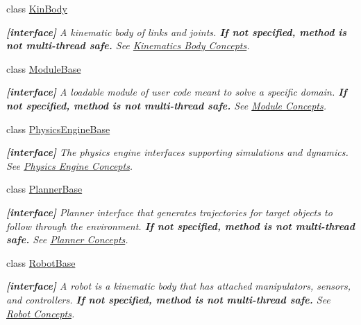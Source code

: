 \begin{DoxyCompactItemize}
class \hyperlink{classOpenRAVE_1_1KinBody}{KinBody}
\begin{DoxyCompactList}\small\item\em {\bfseries \mbox{[}interface\mbox{]}} A kinematic body of links and joints. {\bfseries If not specified, method is not multi-\/thread safe.} See \hyperlink{arch__kinbody}{Kinematics Body Concepts}. \item\end{DoxyCompactList}\item 
class \hyperlink{classOpenRAVE_1_1ModuleBase}{ModuleBase}
\begin{DoxyCompactList}\small\item\em {\bfseries \mbox{[}interface\mbox{]}} A loadable module of user code meant to solve a specific domain. {\bfseries If not specified, method is not multi-\/thread safe.} See \hyperlink{arch__module}{Module Concepts}. \item\end{DoxyCompactList}\item 
class \hyperlink{classOpenRAVE_1_1PhysicsEngineBase}{PhysicsEngineBase}
\begin{DoxyCompactList}\small\item\em {\bfseries \mbox{[}interface\mbox{]}} The physics engine interfaces supporting simulations and dynamics. See \hyperlink{arch__physicsengine}{Physics Engine Concepts}. \item\end{DoxyCompactList}\item 
class \hyperlink{classOpenRAVE_1_1PlannerBase}{PlannerBase}
\begin{DoxyCompactList}\small\item\em {\bfseries \mbox{[}interface\mbox{]}} Planner interface that generates trajectories for target objects to follow through the environment. {\bfseries If not specified, method is not multi-\/thread safe.} See \hyperlink{arch__planner}{Planner Concepts}. \item\end{DoxyCompactList}\item 
class \hyperlink{classOpenRAVE_1_1RobotBase}{RobotBase}
\begin{DoxyCompactList}\small\item\em {\bfseries \mbox{[}interface\mbox{]}} A robot is a kinematic body that has attached manipulators, sensors, and controllers. {\bfseries If not specified, method is not multi-\/thread safe.} See \hyperlink{arch__robot}{Robot Concepts}. \item\end{DoxyCompactList}\item 

\end{DoxyCompactItemize}
